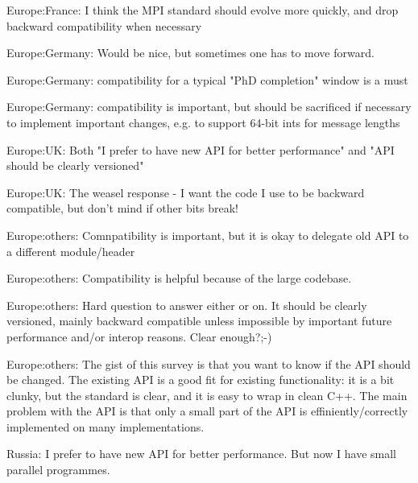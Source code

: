 \item Europe:France: I think the MPI standard should evolve more quickly, and drop backward compatibility when necessary
\item Europe:Germany: Would be nice, but sometimes one has to move forward.
\item Europe:Germany: compatibility for a typical "PhD completion" window is a must
\item Europe:Germany: compatibility is important, but should be sacrificed if necessary to implement important changes, e.g. to support 64-bit ints for message lengths
\item Europe:UK: Both "I prefer to have new API for better performance" and "API should be clearly versioned"
\item Europe:UK: The weasel response - I want the code I use to be backward compatible, but don't mind if other bits break!
\item Europe:others: Comnpatibility is important, but it is okay to delegate old API to a different module/header
\item Europe:others: Compatibility is helpful because of the large codebase.
\item Europe:others: Hard question to answer either or on. It should be clearly versioned, mainly backward compatible unless impossible by important future performance and/or interop reasons. Clear enough?;-)
\item Europe:others: The gist of this survey is that you want to know if the API should be changed. The existing API is a good fit for existing functionality: it is a bit clunky, but the standard is clear, and it is easy to wrap in clean C++. The main problem with the API is that only a small part of the API is effiniently/correctly implemented on many implementations.
\item Russia: I prefer to have new API for better performance. But now I have small parallel programmes.
